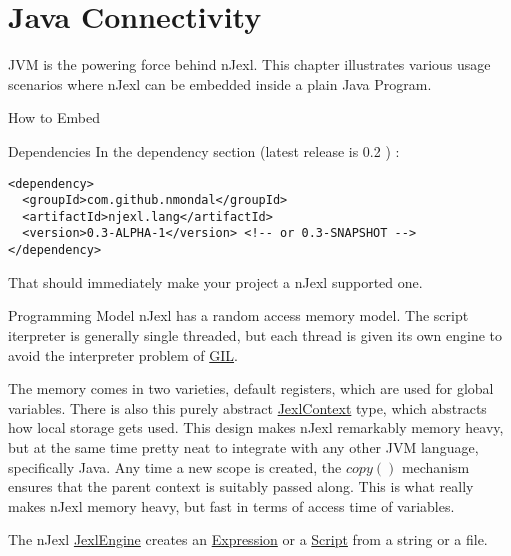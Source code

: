 \chapter{Java Connectivity}\label{java-connectivity}

{\LARGE J}VM is the powering force behind nJexl.
This chapter illustrates various usage scenarios where nJexl can be
embedded inside a plain Java Program.

\begin{section}{How to Embed}

\begin{subsection}{Dependencies}
In the dependency section (latest release is 0.2 ) : 
\begin{lstlisting}[style=XmlStyle]
<dependency>
  <groupId>com.github.nmondal</groupId>
  <artifactId>njexl.lang</artifactId>
  <version>0.3-ALPHA-1</version> <!-- or 0.3-SNAPSHOT -->
</dependency>
\end{lstlisting}
That should immediately make your project a nJexl supported one. 
\end{subsection}

\begin{subsection}{Programming Model}
nJexl has a random access memory model.
The script iterpreter is generally single threaded,
but each thread is given its own engine to avoid
the interpreter problem of \href{https://en.wikipedia.org/wiki/Global\_interpreter\_lock}{GIL}.

The memory comes in two varieties, default registers, which are used for global variables.
There is also this purely abstract 
\href{https://github.com/nmondal/njexl/blob/master/lang/src/main/java/com/noga/njexl/lang/JexlContext.java}{JexlContext} type, 
which abstracts how local storage gets used. This design makes nJexl remarkably memory heavy,
but at the same time pretty neat to integrate with any other JVM language, specifically Java. 
Any time a new scope is created, the $copy()$ mechanism ensures that the parent context is suitably passed along.
This is what really makes nJexl memory heavy, but fast in terms of access time of variables.

The nJexl \href{https://github.com/nmondal/njexl/blob/master/lang/src/main/java/com/noga/njexl/lang/JexlEngine.java}{JexlEngine} 
creates an \href{https://github.com/nmondal/njexl/blob/master/lang/src/main/java/com/noga/njexl/lang/Expression.java}{Expression} 
or a \href{https://github.com/nmondal/njexl/blob/master/lang/src/main/java/com/noga/njexl/lang/Script.java}{Script} 
from a string or a file. 


\end{subsection}
\end{section}
